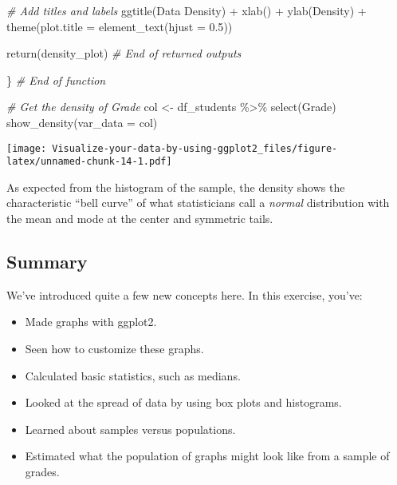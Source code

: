 \documentclass[
]{article}
\newenvironment{Shaded}{\begin{snugshade}}{\end{snugshade}}
\newcommand{\AttributeTok}[1]{\textcolor[rgb]{0.77,0.63,0.00}{#1}}
\newcommand{\CommentTok}[1]{\textcolor[rgb]{0.56,0.35,0.01}{\textit{#1}}}
\newcommand{\FloatTok}[1]{\textcolor[rgb]{0.00,0.00,0.81}{#1}}
\newcommand{\FunctionTok}[1]{\textcolor[rgb]{0.00,0.00,0.00}{#1}}
\newcommand{\NormalTok}[1]{#1}
\newcommand{\OtherTok}[1]{\textcolor[rgb]{0.56,0.35,0.01}{#1}}
\newcommand{\SpecialCharTok}[1]{\textcolor[rgb]{0.00,0.00,0.00}{#1}}
\newcommand{\StringTok}[1]{\textcolor[rgb]{0.31,0.60,0.02}{#1}}
\providecommand{\tightlist}{%
  \setlength{\itemsep}{0pt}\setlength{\parskip}{0pt}}
\begin{document}
\begin{Shaded}
\begin{Highlighting}[]
  \CommentTok{\# Add titles and labels}
  \FunctionTok{ggtitle}\NormalTok{(}\StringTok{\textquotesingle{}Data Density\textquotesingle{}}\NormalTok{) }\SpecialCharTok{+}
  \FunctionTok{xlab}\NormalTok{(}\StringTok{\textquotesingle{}\textquotesingle{}}\NormalTok{) }\SpecialCharTok{+}
  \FunctionTok{ylab}\NormalTok{(}\StringTok{\textquotesingle{}Density\textquotesingle{}}\NormalTok{) }\SpecialCharTok{+}
  \FunctionTok{theme}\NormalTok{(}\AttributeTok{plot.title =} \FunctionTok{element\_text}\NormalTok{(}\AttributeTok{hjust =} \FloatTok{0.5}\NormalTok{))}
  
  
  
  \FunctionTok{return}\NormalTok{(density\_plot) }\CommentTok{\# End of returned outputs}
  
\NormalTok{\} }\CommentTok{\# End of function}


\CommentTok{\# Get the density of Grade}
\NormalTok{col }\OtherTok{\textless{}{-}}\NormalTok{ df\_students }\SpecialCharTok{\%\textgreater{}\%} \FunctionTok{select}\NormalTok{(Grade)}
\FunctionTok{show\_density}\NormalTok{(}\AttributeTok{var\_data =}\NormalTok{ col)}
\end{Highlighting}
\end{Shaded}

\texttt{[image: Visualize-your-data-by-using-ggplot2\_files/figure-latex/unnamed-chunk-14-1.pdf]}

As expected from the histogram of the sample, the density shows the
characteristic ``bell curve'' of what statisticians call a \emph{normal}
distribution with the mean and mode at the center and symmetric tails.

\hypertarget{summary}{%
\subsection{Summary}\label{summary}}

We've introduced quite a few new concepts here. In this exercise,
you've:

\begin{itemize}
\tightlist
\item
  Made graphs with ggplot2.
\item
  Seen how to customize these graphs.
\item
  Calculated basic statistics, such as medians.
\item
  Looked at the spread of data by using box plots and histograms.
\item
  Learned about samples versus populations.
\item
  Estimated what the population of graphs might look like from a sample
  of grades.
\end{itemize}
\end{document}
